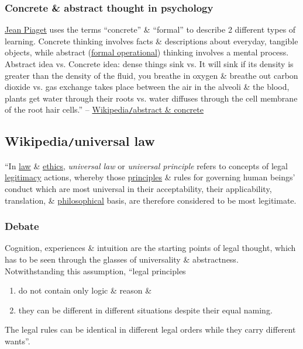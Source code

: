 \documentclass{article}
\begin{document}
\subsubsection{Concrete \& abstract thought in psychology}
\href{https://en.wikipedia.org/wiki/Jean_Piaget}{\sc Jean Piaget} uses the terms ``concrete'' \& ``formal'' to describe 2 different types of learning. Concrete thinking involves facts \& descriptions about everyday, tangible objects, while abstract (\href{https://en.wikipedia.org/wiki/Formal_Operational#Formal_operational_stage}{formal operational}) thinking involves a mental process. Abstract idea vs. Concrete idea: dense things sink vs. It will sink if its density is greater than the density of the fluid, you breathe in oxygen \& breathe out carbon dioxide vs. gas exchange takes place between the air in the alveoli \& the blood, plants get water through their roots vs. water diffuses through the cell membrane of the root hair cells.'' -- \href{https://en.wikipedia.org/wiki/Abstract_and_concrete}{Wikipedia{\tt/}abstract \& concrete}


\subsection{Wikipedia{\tt/}universal law}
``In \href{https://en.wikipedia.org/wiki/Law}{law} \& \href{https://en.wikipedia.org/wiki/Ethics}{ethics}, {\it universal law} or {\it universal principle} refers to concepts of legal \href{https://en.wikipedia.org/wiki/Legitimacy_(political)}{legitimacy} actions, whereby those \href{https://en.wikipedia.org/wiki/Value_(personal_and_cultural)}{principles} \& rules for governing human beings' conduct which are most universal in their acceptability, their applicability, translation, \& \href{https://en.wikipedia.org/wiki/Philosophical}{philosophical} basis, are therefore considered to be most legitimate.

\subsubsection{Debate}
Cognition, experiences \& intuition are the starting points of legal thought, which has to be seen through the glasses of universality \& abstractness. Notwithstanding this assumption, ``legal principles
\begin{enumerate}
	\item do not contain only logic \& reason \&
	\item they can be different in different situations despite their equal naming.
\end{enumerate}
The legal rules can be identical in different legal orders while they carry different wants''.
\end{document}
